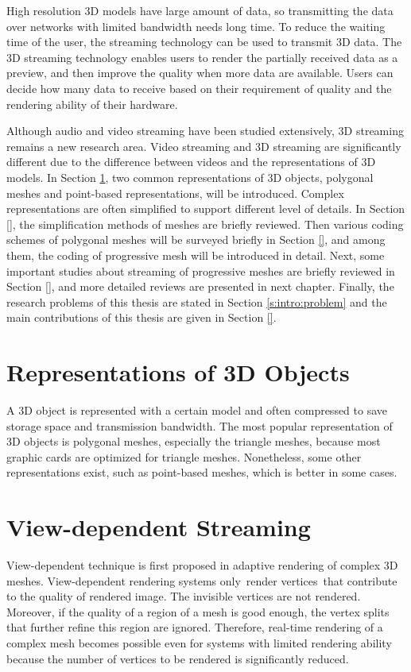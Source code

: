 \documentclass[11pt, a4paper]{report}
\begin{document}
    High resolution 3D models have large amount of data, 
    so transmitting the data over networks with limited bandwidth needs long time. 
    To reduce the waiting time of the user, 
    the streaming technology can be used to transmit 3D data. 
    The 3D streaming technology enables users to render the partially received data as a preview, 
    and then improve the quality when more data are available. 
    Users can decide how many data to receive based on their requirement of quality
    and the rendering ability of their hardware. 

    Although audio and video streaming have been studied extensively, 
    3D streaming remains a new research area. 
    Video streaming and 3D streaming are significantly different
    due to the difference between videos and the representations of 3D models. 
    In Section \ref{s:intro:representation}, two common representations of 3D objects, 
    polygonal meshes and point-based representations, will be introduced. 
    Complex representations are often simplified to support different level of details. 
    In Section \ref{}, the simplification methods of meshes are briefly reviewed. 
    Then various coding schemes of polygonal meshes will be surveyed briefly in Section \ref{}, 
    and among them, the coding of progressive mesh will be introduced in detail. 
    Next, some important studies about streaming of progressive meshes
    are briefly reviewed in Section \ref{}, and more detailed reviews are presented in next chapter.
    Finally, the research problems of this thesis are stated in Section \ref{s:intro:problem}
    and the main contributions of this thesis are given in Section \ref{}.

    \section{Representations of 3D Objects}
    \label{s:intro:representation}
    A 3D object is represented with a certain model and often compressed
    to save storage space and transmission bandwidth. 
    The most popular representation of 3D objects is polygonal meshes, 
    especially the triangle meshes, because most graphic cards are optimized for triangle meshes. 
    Nonetheless, some other representations exist, 
    such as point-based meshes, which is better in some cases.
    \section{View-dependent Streaming}
    \label{s:intro:view_dependent}
    View-dependent technique is first proposed in adaptive rendering of complex 3D meshes. 
    View-dependent rendering systems only render vertices that contribute
    to the quality of rendered image. 
    The invisible vertices are not rendered. 
    Moreover, if the quality of a region of a mesh is good enough, 
    the vertex splits that further refine this region are ignored. 
    Therefore, real-time rendering of a complex mesh becomes possible 
    even for systems with limited rendering ability because the number
    of vertices to be rendered is significantly reduced. 
\end{document}
